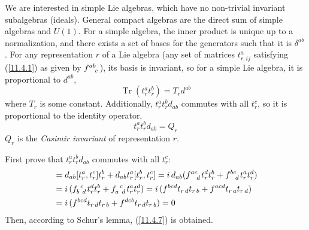 We are interested in simple Lie algebras, which have no non-trivial invariant subalgebras (ideals). General compact algebras are the direct sum of simple algebras and $U(1)$. For a simple algebra, the inner product is unique up to a normalization, and there exists a set of bases for the generators such that it is $\delta^{ab}$. For any representation $r$ of a Lie algebra (any set of matrices $t^{a}_{r,ij}$ satisfying (\ref{11.4.1}) as given by $f\indices{^a^b_c}$), its basis is invariant, so for a simple Lie algebra, it is proportional to $d^{ab}$,
\begin{equation}
	\operatorname{Tr}(t_{r}^{a}t_{r}^{b}) = T_{r}d^{ab} \label{11.4.6}
\end{equation}
where $T_{r}$ is some constant. Additionally, $t_{r}^{a}t_{r}^{b}d_{ab}$ commutes with all $t_{r}^{c}$, so it is proportional to the identity operator,
\begin{equation}
	t_{r}^{a}t_{r}^{b}d_{ab} = Q_{r}  \label{11.4.7}
\end{equation}
$Q_{r}$ is the \emph{Casimir invariant} of representation $r$.
\begin{tcolorbox}[breakable]
	First prove that $t_{r}^{a}t_{r}^{b}d_{ab}$ commutes with all $t_{r}^{c}$:
	\begin{align*}
		[d_{ab}t_{r}^{a}t_{r}^{b},t_{r}^{c}] &= d_{ab}[t_{r}^{a},t_{r}^{c}]t_{r}^{b} 
		+ d_{ab}t_{r}^{a}[t_{r}^{b},t_{r}^{c}] 
		=\mi \, d_{ab} (f\indices{^a^c_d}t_{r}^{d}t_{r}^{b}+ f\indices{^b^c_d}t_{r}^{a}t_{r}^{d}) \\
		&=\mi \, (f\indices{_b^c_d}t_{r}^{d}t_{r}^{b}+ f\indices{_a^c_d}t_{r}^{a}t_{r}^{d}) 
		=\mi \, (f\indices{^b^c^d}t_{r\,d}t_{r\,b}+ f\indices{^a^c^d}t_{r\,a}t_{r\,d}) \\
		&=\mi \, (f\indices{^b^c^d}t_{r\,d}t_{r\,b}+ f\indices{^d^c^b}t_{r\,d}t_{r\,b}) =0
	\end{align*}
	Then, according to Schur's lemma, (\ref{11.4.7}) is obtained.
\end{tcolorbox}

